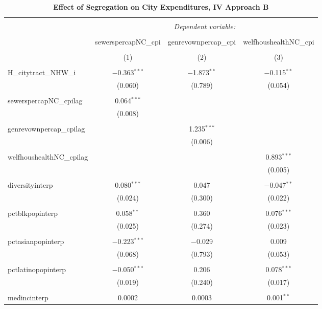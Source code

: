 \documentclass[]{article}
\begin{document}
\begin{table}[!htbp] \centering 
  \caption{\textbf{Effect of Segregation on City Expenditures, IV Approach B}} 
  \label{} 
\begin{tabular}{@{\extracolsep{5pt}}lccc} 
\\[-1.8ex]\hline 
\hline \\[-1.8ex] 
 & \multicolumn{3}{c}{\textit{Dependent variable:}} \\ 
\cline{2-4} 
\\[-1.8ex] & sewerspercapNC\_cpi & genrevownpercap\_cpi & welfhoushealthNC\_cpi \\ 
\\[-1.8ex] & (1) & (2) & (3)\\ 
\hline \\[-1.8ex] 
 H\_citytract\_NHW\_i & $-$0.363$^{***}$ & $-$1.873$^{**}$ & $-$0.115$^{**}$ \\ 
  & (0.060) & (0.789) & (0.054) \\ 
  & & & \\ 
 sewerspercapNC\_cpilag & 0.064$^{***}$ &  &  \\ 
  & (0.008) &  &  \\ 
  & & & \\ 
 genrevownpercap\_cpilag &  & 1.235$^{***}$ &  \\ 
  &  & (0.006) &  \\ 
  & & & \\ 
 welfhoushealthNC\_cpilag &  &  & 0.893$^{***}$ \\ 
  &  &  & (0.005) \\ 
  & & & \\ 
 diversityinterp & 0.080$^{***}$ & 0.047 & $-$0.047$^{**}$ \\ 
  & (0.024) & (0.300) & (0.022) \\ 
  & & & \\ 
 pctblkpopinterp & 0.058$^{**}$ & 0.360 & 0.076$^{***}$ \\ 
  & (0.025) & (0.274) & (0.023) \\ 
  & & & \\ 
 pctasianpopinterp & $-$0.223$^{***}$ & $-$0.029 & 0.009 \\ 
  & (0.068) & (0.793) & (0.053) \\ 
  & & & \\ 
 pctlatinopopinterp & $-$0.050$^{***}$ & 0.206 & 0.078$^{***}$ \\ 
  & (0.019) & (0.240) & (0.017) \\ 
  & & & \\ 
 medincinterp & 0.0002 & 0.0003 & 0.001$^{**}$ \\ 

\end{tabular}
\end{table}
\end{document}
